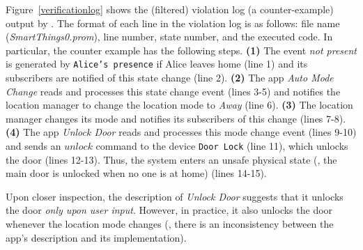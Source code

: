 Figure~\ref{verificationlog} shows the (filtered) violation log (a counter-example) output by \spin.
The format of each line in the violation log is as follows:
file name (\textit{SmartThings0.prom}), line number, state number, and the executed code.
In particular, the counter example has the following steps.
{\bf (1)} The event \textit{not present} is generated by \texttt{Alice's presence} if Alice leaves home (line 1)
and its subscribers are notified of this state change (line 2).
{\bf (2)} The app \textit{Auto Mode Change} reads and processes this state change event (lines 3-5)
and notifies the location manager to change the location mode to \textit{Away} (line 6).
{\bf (3)} The location manager changes its mode and notifies its subscribers of this change (lines 7-8).
{\bf (4)} The app \textit{Unlock Door} reads and processes this mode change event (lines 9-10)
and sends an $unlock$ command to the device \texttt{Door Lock} (line 11),
which unlocks the door (lines 12-13).
Thus, the system enters an unsafe physical state (\ie, the main door is unlocked when no one is at home) (lines 14-15).

Upon closer inspection, the description of \textit{Unlock Door} suggests
that it unlocks the door {\em only upon user input}.
However, in practice, it also unlocks the door whenever the location mode changes
(\ie, there is an inconsistency between the app's description and its implementation).
